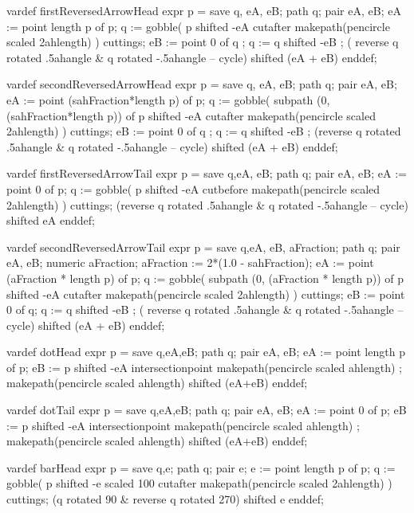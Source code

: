   
  vardef firstReversedArrowHead expr p =
    save q, eA, eB; path q; pair eA, eB;
    eA := point length p of p;
    q := gobble(
      p shifted -eA 
      cutafter makepath(pencircle scaled 2ahlength)
    ) cuttings;
    eB := point 0 of q ;
    q := q shifted -eB ;
    ( reverse q rotated .5ahangle & q rotated -.5ahangle -- cycle)
      shifted (eA + eB)
  enddef;

  vardef secondReversedArrowHead expr p =
    save q, eA, eB; path q; pair eA, eB;
    eA := point (sahFraction*length p) of p;
    q := gobble(
      subpath (0, (sahFraction*length p)) of p shifted -eA 
      cutafter makepath(pencircle scaled 2ahlength)
    ) cuttings;
    eB := point 0 of q ;
    q := q shifted -eB ;
    (reverse q rotated .5ahangle & q rotated -.5ahangle -- cycle)
      shifted (eA + eB)
  enddef;

  vardef firstReversedArrowTail expr p =
    save q,eA, eB; path q; pair eA, eB;
    eA := point 0 of p;
    q := gobble(
      p shifted -eA
      cutbefore makepath(pencircle scaled 2ahlength)
    ) cuttings;
    (reverse q rotated .5ahangle & q rotated -.5ahangle -- cycle)
      shifted eA
  enddef;
  
  vardef secondReversedArrowTail expr p =
    save q,eA, eB, aFraction; path q; pair eA, eB; numeric aFraction;
    aFraction := 2*(1.0 - sahFraction);
    eA := point (aFraction * length p) of p;
    q := gobble(
      subpath (0, (aFraction * length p)) of p shifted -eA
      cutafter makepath(pencircle scaled 2ahlength)
    ) cuttings;
    eB := point 0 of q;
    q := q shifted -eB ;
    ( reverse q rotated .5ahangle & q rotated -.5ahangle -- cycle)
      shifted (eA + eB)
  enddef;
  
  
  vardef dotHead expr p =
    save q,eA,eB; path q; pair eA, eB;
    eA := point length p of p;
    eB := p shifted -eA intersectionpoint makepath(pencircle scaled ahlength) ;
    makepath(pencircle scaled ahlength) shifted (eA+eB)
  enddef;
  
  vardef dotTail expr p =
    save q,eA,eB; path q; pair eA, eB;
    eA := point 0 of p;
    eB := p shifted -eA intersectionpoint makepath(pencircle scaled ahlength) ;
    makepath(pencircle scaled ahlength) shifted (eA+eB)
  enddef;

  
  vardef barHead expr p =
    save q,e; path q; pair e;
    e := point length p of p;
    q := gobble(
      p shifted -e scaled 100
      cutafter makepath(pencircle scaled 2ahlength)
    ) cuttings;
    (q rotated 90 & reverse q rotated 270) shifted e
  enddef;


